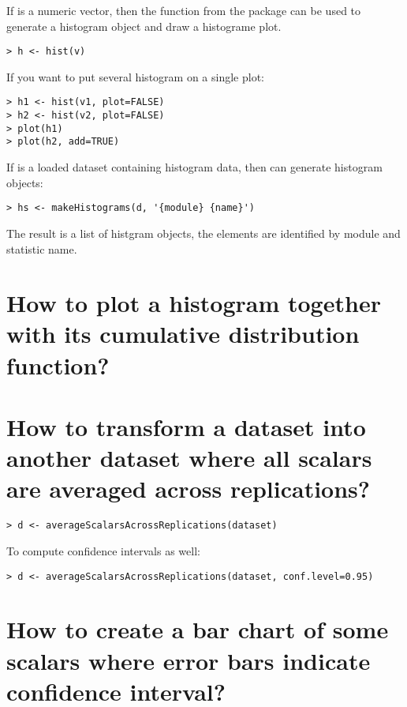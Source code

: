 If  is a numeric vector, then the  function from the  package
can be used to generate a histogram object and draw a histograme plot.

\begin{verbatim}
> h <- hist(v)
\end{verbatim}

If you want to put several histogram on a single plot:

\begin{verbatim}
> h1 <- hist(v1, plot=FALSE)
> h2 <- hist(v2, plot=FALSE)
> plot(h1)
> plot(h2, add=TRUE)
\end{verbatim}

If  is a loaded dataset containing histogram data, then  can generate
histogram objects:

\begin{verbatim}
> hs <- makeHistograms(d, '{module} {name}') 
\end{verbatim}

The result is a list of histgram objects, the elements are identified by module and statistic name.

\section{How to plot a histogram together with its cumulative distribution function?}

\section{How to transform a dataset into another dataset where all scalars are averaged across replications?}

\begin{verbatim}
> d <- averageScalarsAcrossReplications(dataset)
\end{verbatim}

To compute confidence intervals as well:

\begin{verbatim}
> d <- averageScalarsAcrossReplications(dataset, conf.level=0.95)
\end{verbatim}

\section{How to create a bar chart of some scalars where error bars indicate confidence interval?}

